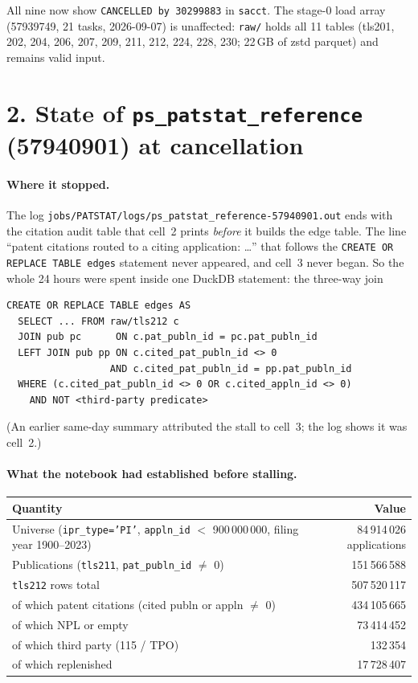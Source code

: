 \documentclass[11pt]{article}
\begin{document}
All nine now show \texttt{CANCELLED by 30299883} in \texttt{sacct}. The stage-0 load array
(57939749, 21 tasks, 2026-09-07) is unaffected: \texttt{raw/} holds all 11 tables
(tls201, 202, 204, 206, 207, 209, 211, 212, 224, 228, 230; 22\,GB of zstd parquet) and remains valid input.

\section*{2. State of \texttt{ps\_patstat\_reference} (57940901) at cancellation}

\paragraph{Where it stopped.}
The log \texttt{jobs/PATSTAT/logs/ps\_patstat\_reference-57940901.out} ends with the
citation audit table that cell~2 prints \emph{before} it builds the edge table. The line
``patent citations routed to a citing application: \ldots'' that follows the
\texttt{CREATE OR REPLACE TABLE edges} statement never appeared, and cell~3 never began.
So the whole 24 hours were spent inside one DuckDB statement: the three-way join

\begin{lstlisting}
CREATE OR REPLACE TABLE edges AS
  SELECT ... FROM raw/tls212 c
  JOIN pub pc      ON c.pat_publn_id = pc.pat_publn_id
  LEFT JOIN pub pp ON c.cited_pat_publn_id <> 0
                  AND c.cited_pat_publn_id = pp.pat_publn_id
  WHERE (c.cited_pat_publn_id <> 0 OR c.cited_appln_id <> 0)
    AND NOT <third-party predicate>
\end{lstlisting}

(An earlier same-day summary attributed the stall to cell~3; the log shows it was cell~2.)

\paragraph{What the notebook had established before stalling.}
\begin{center}
\small
\begin{tabular}{lr}
\toprule
Quantity & Value \\
\midrule
Universe (\texttt{ipr\_type='PI'}, \texttt{appln\_id} $<$ 900\,000\,000, filing year 1900--2023) & 84\,914\,026 applications \\
Publications (\texttt{tls211}, \texttt{pat\_publn\_id} $\neq$ 0) & 151\,566\,588 \\
\texttt{tls212} rows total & 507\,520\,117 \\
\quad of which patent citations (cited publn or appln $\neq$ 0) & 434\,105\,665 \\
\quad of which NPL or empty & 73\,414\,452 \\
\quad of which third party (115 / TPO) & 132\,354 \\
\quad of which replenished & 17\,728\,407 \\
\bottomrule
\end{tabular}
\end{center}
\end{document}
